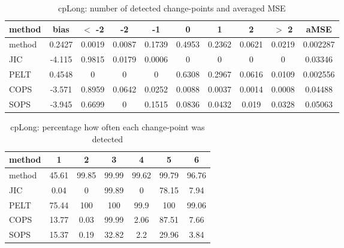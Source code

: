 \begin{table}[ht]
\centering
\begin{tabular}{l|c|ccccccc|c}
  \hline
method & bias & $<$ -2 & -2 & -1 & 0 & 1 & 2 & $>$ 2 & aMSE \\ 
  \hline
method & 0.2427 & 0.0019 & 0.0087 & 0.1739 & 0.4953 & 0.2362 & 0.0621 & 0.0219 & 0.002287 \\ 
  JIC & -4.115 & 0.9815 & 0.0179 & 0.0006 &     0 &     0 &     0 &     0 & 0.03346 \\ 
  PELT & 0.4548 &     0 &     0 &     0 & 0.6308 & 0.2967 & 0.0616 & 0.0109 & 0.002556 \\ 
  COPS & -3.571 & 0.8959 & 0.0642 & 0.0252 & 0.0088 & 0.0037 & 0.0014 & 0.0008 & 0.04488 \\ 
  SOPS & -3.945 & 0.6699 &     0 & 0.1515 & 0.0836 & 0.0432 & 0.019 & 0.0328 & 0.05063 \\ 
   \hline
\end{tabular}
\caption{cpLong: number of detected change-points and averaged MSE} 
\label{tab:cpLongNjumps}
\end{table}
\begin{table}[ht]
\centering
\begin{tabular}{l|cccccc}
  \hline
method & 1 & 2 & 3 & 4 & 5 & 6 \\ 
  \hline
method &  45.61 &  99.85 &  99.99 &  99.62 &  99.79 &  96.76 \\ 
  JIC &   0.04 &      0 &  99.89 &      0 &  78.15 &   7.94 \\ 
  PELT &  75.44 &    100 &    100 &   99.9 &    100 &  99.06 \\ 
  COPS &  13.77 &   0.03 &  99.99 &   2.06 &  87.51 &   7.66 \\ 
  SOPS &  15.37 &   0.19 &  32.82 &    2.2 &  29.96 &   3.84 \\ 
   \hline
\end{tabular}
\caption{cpLong: percentage how often each change-point was detected} 
\label{tab:cpLongDetections}
\end{table}
